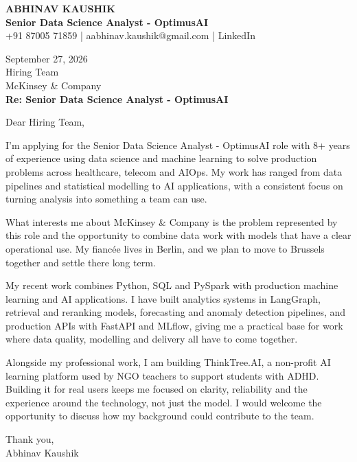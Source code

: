 \documentclass[10pt,a4paper]{article}
\begin{document}
\begin{center}
{\Large\bfseries ABHINAV KAUSHIK}\\[2pt]
{\bfseries Senior Data Science Analyst - OptimusAI}\\[2pt]
+91 87005 71859 \quad | \quad aabhinav.kaushik@gmail.com \quad | \quad LinkedIn
\end{center}
\vspace{8pt}
September 27, 2026\\[6pt]
Hiring Team\\
McKinsey \& Company\\[4pt]
\textbf{Re: Senior Data Science Analyst - OptimusAI}

Dear Hiring Team,

I’m applying for the Senior Data Science Analyst - OptimusAI role with 8+ years of experience using data science and machine learning to solve production problems across healthcare, telecom and AIOps. My work has ranged from data pipelines and statistical modelling to AI applications, with a consistent focus on turning analysis into something a team can use.

What interests me about McKinsey \& Company is the problem represented by this role and the opportunity to combine data work with models that have a clear operational use. My fiancée lives in Berlin, and we plan to move to Brussels together and settle there long term.

My recent work combines Python, SQL and PySpark with production machine learning and AI applications. I have built analytics systems in LangGraph, retrieval and reranking models, forecasting and anomaly detection pipelines, and production APIs with FastAPI and MLflow, giving me a practical base for work where data quality, modelling and delivery all have to come together.

Alongside my professional work, I am building ThinkTree.AI, a non-profit AI learning platform used by NGO teachers to support students with ADHD. Building it for real users keeps me focused on clarity, reliability and the experience around the technology, not just the model. I would welcome the opportunity to discuss how my background could contribute to the team.

Thank you,\\
Abhinav Kaushik
\end{document}
